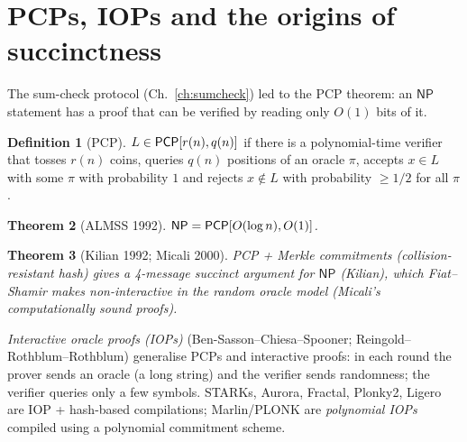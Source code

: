 \documentclass[11pt,a4paper]{report}
\theoremstyle{plain}
\newtheorem{theorem}{Theorem}[chapter]
\theoremstyle{definition}
\newtheorem{definition}[theorem]{Definition}
\theoremstyle{remark}
\newcommand{\NP}{\mathsf{NP}}\newcommand{\BPP}{\mathsf{BPP}}\newcommand{\IP}{\mathsf{IP}}
\begin{document}
\section{PCPs, IOPs and the origins of succinctness}
The sum-check protocol (Ch.~\ref{ch:sumcheck}) led to the PCP theorem: an $\NP$ statement has a proof that can be verified by reading only $O(1)$ bits of it.
\begin{definition}[PCP]
$L\in\mathsf{PCP}[r(n),q(n)]$ if there is a polynomial-time verifier that tosses $r(n)$ coins, queries $q(n)$ positions of an oracle $\pi$, accepts $x\in L$ with some $\pi$ with probability $1$ and rejects $x\notin L$ with probability $\ge1/2$ for all $\pi$.
\end{definition}
\begin{theorem}[ALMSS 1992]
$\NP=\PCP[O(\log n),O(1)]$.
\end{theorem}
\begin{center}
\end{center}
\begin{theorem}[Kilian 1992; Micali 2000]
PCP + Merkle commitments (collision-resistant hash) gives a 4-message succinct argument for $\NP$ (Kilian), which Fiat--Shamir makes non-interactive in the random oracle model (Micali's computationally sound proofs).
\end{theorem}
\emph{Interactive oracle proofs (IOPs)} (Ben-Sasson--Chiesa--Spooner; Reingold--Rothblum--Rothblum) generalise PCPs and interactive proofs: in each round the prover sends an oracle (a long string) and the verifier sends randomness; the verifier queries only a few symbols. STARKs, Aurora, Fractal, Plonky2, Ligero are IOP + hash-based compilations; Marlin/PLONK are \emph{polynomial IOPs} compiled using a polynomial commitment scheme.
\end{document}

